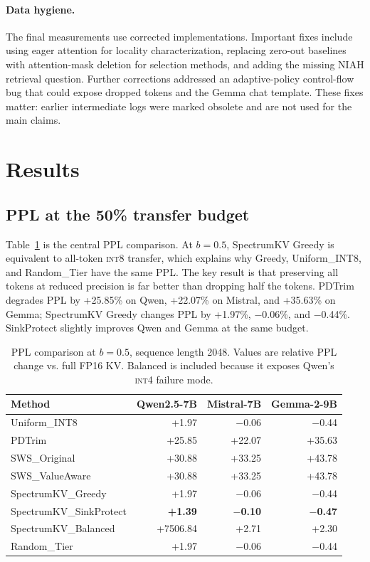 \documentclass[11pt]{article}
\newcommand{\method}{SpectrumKV}
\newcommand{\niah}{NIAH}
\newcommand{\budget}{b}
\newcommand{\pct}{\%}
\newcommand{\intviii}{\textsc{int8}}
\newcommand{\intiv}{\textsc{int4}}
\theoremstyle{plain}
\theoremstyle{definition}
\begin{document}
\paragraph{Data hygiene.}
The final measurements use corrected implementations.  Important fixes include using eager attention for locality characterization, replacing zero-out baselines with attention-mask deletion for selection methods, and adding the missing \niah{} retrieval question.  Further corrections addressed an adaptive-policy control-flow bug that could expose dropped tokens and the Gemma chat template.  These fixes matter: earlier intermediate logs were marked obsolete and are not used for the main claims.

\section{Results}
\label{sec:results}

\subsection{PPL at the 50\pct{} transfer budget}
\label{sec:rq7}

Table~\ref{tab:ppl50} is the central PPL comparison.  At $\budget=0.5$, \method{} Greedy is equivalent to all-token \intviii{} transfer, which explains why Greedy, Uniform\_INT8, and Random\_Tier have the same PPL.  The key result is that preserving all tokens at reduced precision is far better than dropping half the tokens.  PDTrim degrades PPL by +25.85\pct{} on Qwen, +22.07\pct{} on Mistral, and +35.63\pct{} on Gemma; \method{} Greedy changes PPL by +1.97\pct{}, $-$0.06\pct{}, and $-$0.44\pct{}.  SinkProtect slightly improves Qwen and Gemma at the same budget.

\begin{table}[t]
\centering
\caption{PPL comparison at $\budget=0.5$, sequence length 2048.  Values are relative PPL change vs. full FP16 KV.  Balanced is included because it exposes Qwen's \intiv{} failure mode.}
\label{tab:ppl50}
\small
\begin{tabular}{lrrr}
\toprule
Method & Qwen2.5-7B & Mistral-7B & Gemma-2-9B \\
\midrule
Uniform\_INT8 & +1.97 & $-$0.06 & $-$0.44 \\
PDTrim & +25.85 & +22.07 & +35.63 \\
SWS\_Original & +30.88 & +33.25 & +43.78 \\
SWS\_ValueAware & +30.88 & +33.25 & +43.78 \\
\method{}\_Greedy & +1.97 & $-$0.06 & $-$0.44 \\
\method{}\_SinkProtect & \textbf{+1.39} & \textbf{$-$0.10} & \textbf{$-$0.47} \\
\method{}\_Balanced & +7506.84 & +2.71 & +2.30 \\
Random\_Tier & +1.97 & $-$0.06 & $-$0.44 \\
\bottomrule
\end{tabular}
\end{table}
\end{document}
